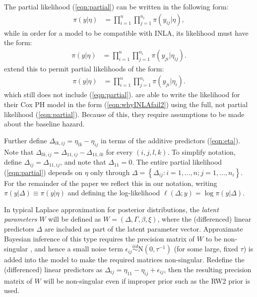 \documentclass[ba]{imsart}
\begin{document}
The partial likelihood (\ref{eqn:partial}) can be written in the following form:
\begin{equation}\begin{aligned}\label{eqn:whyINLAfail1}
\pi(y|\eta) &= \prod_{i=1}^{n}\prod_{j=1}^{n_{i}} \pi(y_{ij}|\eta),
\end{aligned}\end{equation}
while in order for a model to be compatible with INLA, its likelihood must have the form:
\begin{equation}\begin{aligned}\label{eqn:whyINLAfail2}
\pi(y|\eta) &= \prod_{i=1}^{n}\prod_{j=1}^{n_{i}} \pi(y_{ji}|\eta_{ij}).
\end{aligned}\end{equation}
\cite{casecross} extend this to permit partial likelihoods of the form:
\begin{equation}\begin{aligned}\label{eqn:casecrosslik}
\pi(y|\eta) &= \prod_{i=1}^{n}\prod_{j=1}^{n_{i}} \pi(y_{ji}|\eta_{i}).
\end{aligned}\end{equation}
which still does not include (\ref{eqn:partial}). \cite{inlacoxph} are able to write the likelihood for their Cox PH model in the form (\ref{eqn:whyINLAfail2}) using the full, not partial likelihood (\ref{eqn:partial}). Because of this, they require assumptions to be made about the baseline hazard.

Further define $\Delta_{lk,ij} = \eta_{lk} - \eta_{ij}$ in terms of the additive predictors (\ref{eqn:eta}). Note that $\Delta_{lk,ij} = \Delta_{11,ij} - \Delta_{11,lk}$ for every $(i,j,l,k)$. To simplify notation, define $\Delta_{ij} = \Delta_{11,ij}$, and note that $\Delta_{11} = 0$. The entire partial likelihood (\ref{eqn:partial}) depends on $\eta$ only through  $\Delta = \left\{\Delta_{ij}: i = 1,\ldots,n; j = 1,\ldots,n_{i} \right\}$. For the remainder of the paper we reflect this in our notation, writing $\pi(y|\Delta) \equiv \pi(y|\eta)$ and defining the log-likelihood $\ell(\Delta; y) = \log\pi(y|\Delta)$.

In typical Laplace approximation for posterior distributions, the \textit{latent parameters} $W$ will be defined as $W = \left(\Delta, \Gamma,\beta, \xi \right)$, where the (differenced) linear predictors $\Delta$ are included as part of the latent parameter vector. Approximate Bayesian inference of this type requires the precision matrix of $W$ to be non-singular \citep{inla,inlacoxph,casecross}, and hence a small noise term $\epsilon_{ij} \stackrel{iid}{\sim} \text{N}(0,\tau^{-1})$ (for some large, fixed $\tau$) is added into the model to make the required matrices non-singular. Redefine the (differenced) linear predictors as $\Delta_{ij} = \eta_{11} - \eta_{ij} + \epsilon_{ij}$, then the resulting precision matrix of $W$ will be non-singular even if improper prior such as the RW2 prior is used.
\end{document}
